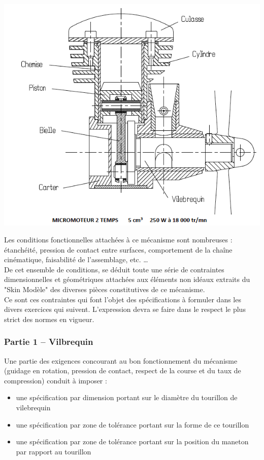 \begin{center}
\includegraphics[scale=0.65]{png/moteur2temps.png}
\end{center}

Les conditions fonctionnelles attachées à ce mécanisme sont nombreuses : étanchéité, pression de contact entre surfaces, comportement de la chaîne cinématique, faisabilité de l'assemblage, etc. \dots\\
De cet ensemble de conditions, se déduit toute une série de contraintes dimensionnelles et géométriques attachées aux éléments non idéaux extraits du "Skin Modèle" des diverses pièces constitutives de ce mécanisme.\\
Ce sont ces contraintes qui font l'objet des spécifications à formuler dans les divers exercices qui suivent. L'expression devra se faire dans le respect le plus strict des normes en vigueur.

\newpage
\subsubsection{Partie 1 -- Vilbrequin}
Une partie des exigences concourant au bon fonctionnement du mécanisme (guidage en rotation, pression de contact, respect de la course et du taux de compression) conduit à imposer :

\begin{itemize}
\item une spécification par dimension portant sur le diamètre du tourillon de vilebrequin
\item une spécification par zone de tolérance portant sur la forme de ce tourillon
\item une spécification par zone de tolérance portant sur la position du maneton par rapport au tourillon
\end{itemize}

